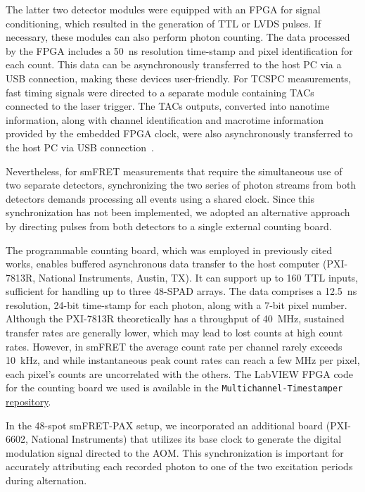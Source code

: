 The latter two detector modules were equipped with an \ac{FPGA} for signal conditioning, which resulted in the generation of \ac{TTL} or \ac{LVDS} pulses. 
If necessary, these modules can also perform photon counting. 
The data processed by the \ac{FPGA} includes a 50~ns resolution time-stamp and pixel identification for each count. 
This data can be asynchronously transferred to the host PC via a USB connection, making these devices user-friendly. 
For \ac{TCSPC} measurements, fast timing signals were directed to a separate module containing \ac{TACs} connected to the laser trigger.
The \ac{TACs} outputs, converted into nanotime information, along with channel identification and macrotime information provided by the embedded \ac{FPGA} clock, were also asynchronously transferred to the host PC via USB connection~\cite{cuccato_IEEEPJ_2013}.

Nevertheless, for \ac{smFRET} measurements that require the simultaneous use of two separate detectors, synchronizing the two series of photon streams from both detectors demands processing all events using a shared clock. 
Since this synchronization has not been implemented, we adopted an alternative approach by directing pulses from both detectors to a single external counting board.

The programmable counting board, which was employed in previously cited works, enables buffered asynchronous data transfer to the host computer (PXI-7813R, National Instruments, Austin, TX). 
It can support up to 160 \ac{TTL} inputs, sufficient for handling up to three 48-\ac{SPAD} arrays. 
The data comprises a 12.5~ns resolution, 24-bit time-stamp for each photon, along with a 7-bit pixel number. 
Although the PXI-7813R theoretically has a throughput of 40~MHz, sustained transfer rates are generally lower, which may lead to lost counts at high count rates. 
However, in \ac{smFRET} the average count rate per channel rarely exceeds 10~kHz, and while instantaneous peak count rates can reach a few MHz per pixel, each pixel's counts are uncorrelated with the others. 
The LabVIEW \ac{FPGA} code for the counting board we used is available in the \texttt{Multichannel-Timestamper} \href{https://github.com/multispot-software/MultichannelTimestamper}{repository}.

In the 48-spot smFRET-PAX setup, we incorporated an additional board (PXI-6602, National Instruments) that utilizes its base clock to generate the digital modulation signal directed to the \ac{AOM}.
This synchronization is important for accurately attributing each recorded photon to one of the two excitation periods during alternation.

